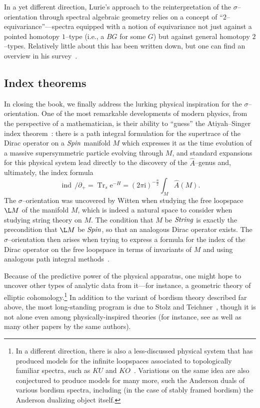 In a yet different direction, Lurie's approach to the reinterpretation of the \(\sigma\)--orientation through spectral algebraic geometry relies on a concept of ``\(2\)--equivariance''---spectra equipped with a notion of equivariance not just against a pointed homotopy \(1\)--type (i.e., a \(BG\) for some \(G\)) but against general homotopy \(2\)--types.  Relatively little about this has been written down, but one can find an overview in his survey~\cite[Section 5.3]{LurieSurveyOfEll}.



\subsection*{Index theorems}

In closing the book, we finally address the lurking physical inspiration for the \(\sigma\)--orientation.  One of the most remarkable developments of modern physics, from the perspective of a mathematician, is their ability to ``guess'' the Atiyah--Singer index theorem~\cite[Section 8.6]{Takhtajan}: there is a path integral formulation for the supertrace of the Dirac operator on a \(\mathit{Spin}\) manifold \(M\) which expresses it as the time evolution of a massive supersymmetric particle evolving through \(M\), and standard expansions for this physical system lead directly to the discovery of the \(\widehat A\)--genus and, ultimately, the index formula \[\operatorname{ind}\, /\!\!\!\partial_+ = \operatorname{Tr}_s \mathrm e^{-H} = (2 \pi \mathrm i)^{-\frac{n}{2}} \int_M \widehat A(M).\]  The \(\sigma\)--orientation was uncovered by Witten when studying the free loopspace \(\L M\) of the manifold \(M\), which is indeed a natural space to consider when studying string theory on \(M\).  The condition that \(M\) be \(\mathit{String}\) is exactly the precondition that \(\L M\) be \(\mathit{Spin}\), so that an analogous Dirac operator exists.  The \(\sigma\)--orientation then arises when trying to express a formula for the index of the Dirac operator on the free loopspace in terms of invariants of \(M\) and using analogous path integral methods~\cite{SegalEll}.

Because of the predictive power of the physical apparatus, one might hope to uncover other types of analytic data from it---for instance, a geometric theory of elliptic cohomology.\footnote{In a different direction, there is also a less-discussed physical system that has produced models for the infinite loopspaces associated to topologically familiar spectra, such as \(KU\) and \(KO\)~\cite{Kitaev}.  Variations on the same idea are also conjectured to produce models for many more, such the Anderson duals of various bordism spectra, including (in the case of stably framed bordism) the Anderson dualizing object itself.}  In addition to the variant of bordism theory described far above, the most long-standing program is due to Stolz and Teichner~\cite{StolzTeichnerWhatIs,StolzTeichnerSusy}, though it is not alone even among physically-inspired theories (for instance, see \cite{DouglasHenriques} as well as many other papers by the same authors).

